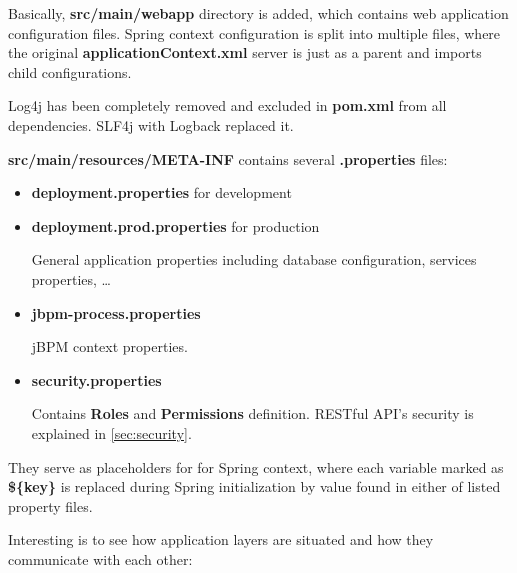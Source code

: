 	Basically, \textbf{src/main/webapp} directory is added, which contains web application configuration files. Spring
	context configuration is split into multiple files, where the original \textbf{applicationContext.xml} server is just
	as a parent and imports child configurations.
	
	Log4j has been completely removed and excluded in \textbf{pom.xml} from all
	dependencies. SLF4j with Logback replaced it.
	
	\textbf{src/main/resources/META-INF} contains several \textbf{.properties} files:
	
	\begin{itemize}
		\item \textbf{deployment.properties} for development
		\item \textbf{deployment.prod.properties} for production
		
		General application properties including database configuration, services properties, \ldots
		\item \textbf{jbpm-process.properties}
		
		jBPM context properties.
		\item \textbf{security.properties}
		
		Contains \textbf{Roles} and \textbf{Permissions} definition. RESTful API's security is explained in
		\ref{sec:security}.
	\end{itemize}
	
	They serve as placeholders for for Spring context, where each variable marked as \textbf{\$\{key\}} is replaced during
	Spring initialization by value found in either of listed property files.
	
	Interesting is to see how application layers are situated and how they communicate with each other:
	
